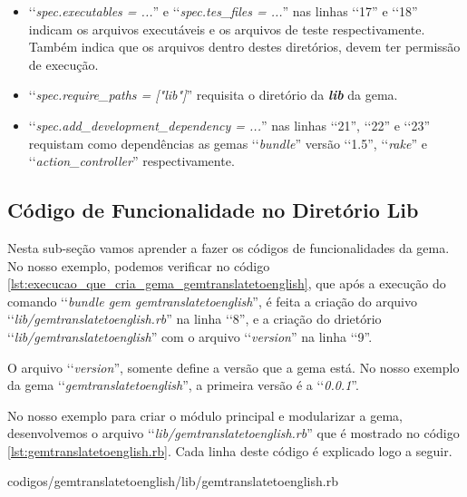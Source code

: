 \begin{itemize}
 \item ‘‘\emph{spec.executables = ...}'' e ‘‘\emph{spec.tes\_files = ...}'' nas linhas ‘‘17'' e ‘‘18''
 indicam os arquivos executáveis e os arquivos de teste respectivamente. Também indica que os arquivos dentro
 destes diretórios, devem ter permissão de execução.

 \item ‘‘\emph{spec.require\_paths = ["lib"]}'' requisita o diretório da \emph{\textbf{lib}} da gema.

 \item ‘‘\emph{spec.add\_development\_dependency = ...}'' nas linhas ‘‘21'', ‘‘22'' e ‘‘23'' requistam como
 dependências as gemas ‘‘\emph{bundle}'' versão ‘‘1.5'', ‘‘\emph{rake}'' e ‘‘\emph{action\_controller}''
 respectivamente.

\end{itemize}


\subsection{Código de Funcionalidade no Diretório Lib}
\label{subsection:codigo_de_funcionalidade_no_diretorio_lib}


Nesta sub-seção vamos aprender a fazer os códigos de funcionalidades da gema. No nosso exemplo,
podemos verificar no código \ref{lst:execucao_que_cria_gema_gemtranslatetoenglish}, que após a
execução do comando ‘‘\emph{bundle gem gemtranslatetoenglish}'', é feita a criação do arquivo
‘‘\emph{lib/gemtranslatetoenglish.rb}'' na linha ‘‘8'', e a criação do drietório
‘‘\emph{lib/gemtranslatetoenglish}'' com o arquivo ‘‘\emph{version}'' na linha ‘‘9''.

O arquivo ‘‘\emph{version}'', somente define a versão que a gema está. No nosso exemplo da gema
‘‘\emph{gemtranslatetoenglish}'', a primeira versão é a ‘‘\emph{0.0.1}''.

No nosso exemplo para criar o módulo principal e modularizar a gema, desenvolvemos o arquivo
‘‘\emph{lib/gemtranslatetoenglish.rb}'' que é mostrado no código
\ref{lst:gemtranslatetoenglish.rb}. Cada linha deste código é explicado logo a seguir.


{codigos/gemtranslatetoenglish/lib/gemtranslatetoenglish.rb}

